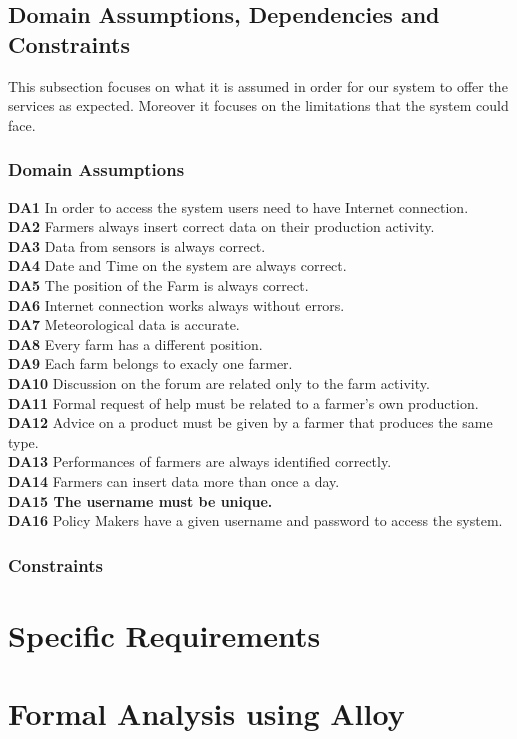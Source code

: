 \documentclass{article}
\begin{document}
\subsection{Domain Assumptions, Dependencies and Constraints}
This subsection focuses on what it is assumed in order for our system to offer the services as expected.
Moreover it focuses on the limitations that the system could face.

\subsubsection{Domain Assumptions}
\textbf{DA1} In order to access the system users need to have Internet connection.\\
\textbf{DA2} Farmers always insert correct data on their production activity.\\
\textbf{DA3} Data from sensors is always correct.\\
\textbf{DA4} Date and Time on the system are always correct.\\
\textbf{DA5} The position of the Farm is always correct.\\
\textbf{DA6} Internet connection works always without errors.\\
\textbf{DA7} Meteorological data is accurate.\\
\textbf{DA8} Every farm has a different position.\\
\textbf{DA9} Each farm belongs to exacly one farmer.\\
\textbf{DA10} Discussion on the forum are related only to the farm activity.\\
\textbf{DA11} Formal request of help must be related to a farmer's own production.\\
\textbf{DA12} Advice on a product must be given by a farmer that produces the same type.\\
\textbf{DA13} Performances of farmers are always identified correctly.\\
\textbf{DA14} Farmers can insert data more than once a day.\\
\textbf{DA15 The username must be unique.}\\
\textbf{DA16} Policy Makers have a given username and password to access the system.

\subsubsection{Constraints}


\section{Specific Requirements}

\section{Formal Analysis using Alloy}
\end{document}
